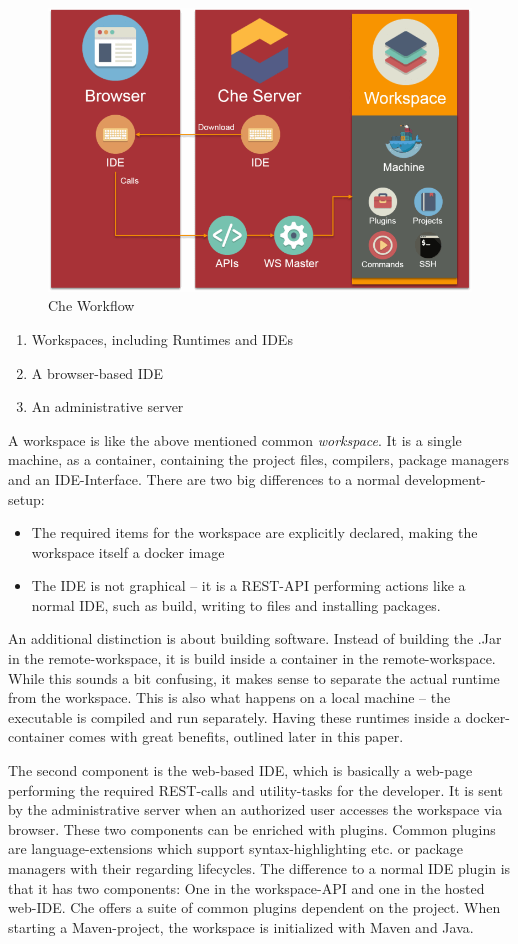 \documentclass[utf8]{lni}
\begin{document}
\begin{figure}[h]
	\centering
	\includegraphics[width=0.7\linewidth]{imgs/Che_Workflow}
	\caption[Che Workflow]{Che Workflow}
	\label{fig:cheworkflow}
\end{figure}
\newpage

\begin{enumerate}
	\item Workspaces, including Runtimes and IDEs
	\item A browser-based IDE
	\item An administrative server
\end{enumerate}
A workspace is like the above mentioned common \textit{workspace}. 
It is a single machine, as a container, containing the project files, compilers, package managers and an IDE-Interface. 
There are two big differences to a normal development-setup:
\begin{itemize}
	\item The required items for the workspace are explicitly  declared, making  the  workspace itself a docker image
	\item The IDE is not graphical – it is a REST-API performing actions like a normal IDE, such as build, writing to files and installing packages.  
\end{itemize}
An additional distinction is about building software.
Instead of building the .Jar in the remote-workspace, it is build inside a container in the remote-workspace.
While this sounds a bit confusing, it makes sense to separate the actual runtime from the workspace. 
This is also what happens on a local machine – the executable is compiled and run separately. 
Having these runtimes inside a docker-container comes with great benefits, outlined later in this paper.

The second component is the web-based IDE, which is basically a web-page performing the required REST-calls and utility-tasks for the developer. 
It is sent by the administrative server when an authorized user accesses the workspace via browser. 
These two components can be enriched with plugins.  
Common plugins are language-extensions which support syntax-highlighting etc. or package managers with their regarding lifecycles.
The difference to a normal IDE plugin is that it has two components: 
One in the workspace-API and one in the hosted web-IDE.  
Che offers a suite of common plugins dependent on the project. 
When starting a Maven-project, the workspace is initialized with Maven and Java.
\end{document}
